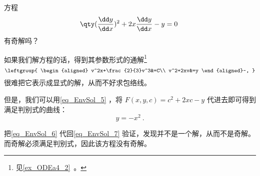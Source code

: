 \begin{example}{}
方程
\begin{equation}\label{eq_EnvSol_7}
\qty(\frac{\dd y}{\dd x})^2+2x\frac{\dd y}{\dd x}-y=0~
\end{equation}
有奇解吗？

如果我们解方程的话，得到其参数形式的通解\footnote{见\autoref{ex_ODEa4_2}~。}
\begin{equation}
\leftgroup{
    \begin{aligned}
    v^2x+\frac{2}{3}v^3&=C\\
    v^2+2xv&=y
    \end{aligned}~,
}
\end{equation}
很难把它表示成显式的解，从而不好求包络线。

但是，我们可以用\autoref{eq_EnvSol_5} ，将 $F(x, y, c)=c^2+2xc-y$ 代进去即可得到满足判别式的曲线：
\begin{equation}\label{eq_EnvSol_6}
y=-x^2~.
\end{equation}

把\autoref{eq_EnvSol_6} 代回\autoref{eq_EnvSol_7} 验证，发现并不是一个解，从而不是奇解。而奇解必须满足判别式，因此该方程没有奇解。

\end{example}























